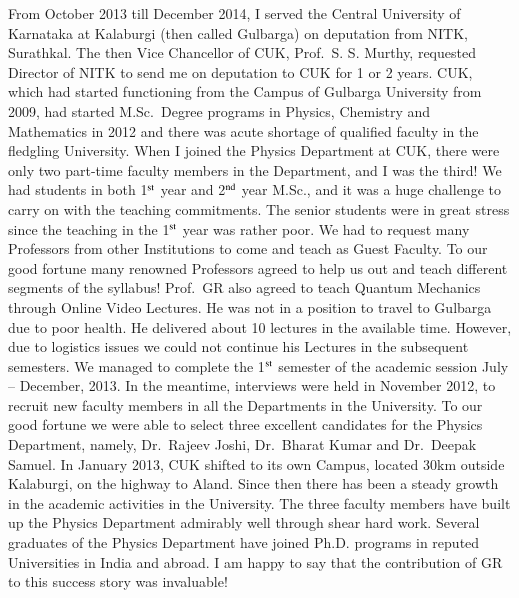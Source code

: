 From October 2013 till December 2014, I served the Central University of Karnataka at Kalaburgi (then called Gulbarga) on deputation from NITK, Surathkal. The then Vice Chancellor of CUK, Prof.\ S. S. Murthy, requested Director of NITK to send me on deputation to CUK for 1 or 2 years. CUK, which had started functioning from the Campus of Gulbarga University from 2009, had started M.Sc.\ Degree programs in Physics, Chemistry and Mathematics in 2012 and there was acute shortage of qualified faculty in the fledgling University. When I joined the Physics Department at CUK, there were only two part-time faculty members in the Department, and I was the third! We had students in both 1$^{\rm st}$ year and 2$^{\rm nd}$ year M.Sc., and it was a huge challenge to carry on with the teaching commitments. The senior students were in great stress since the teaching in the 1$^{\rm st}$ year was rather poor. We had to request many Professors from other Institutions to come and teach as Guest Faculty. To our good fortune many renowned Professors agreed to help us out and teach different segments of the syllabus! Prof.\ GR also agreed to teach Quantum Mechanics through Online Video Lectures. He was not in a position to travel to Gulbarga due to poor health. He delivered about 10 lectures in the available time. However, due to logistics issues we could not continue his Lectures in the subsequent semesters. We managed to complete the 1$^{\rm st}$ semester of the academic session July – December, 2013. In the meantime, interviews were held in November 2012, to recruit new faculty members in all the Departments in the University. To our good fortune we were able to select three excellent candidates for the Physics Department, namely, Dr.\ Rajeev Joshi, Dr.\ Bharat Kumar and Dr.\ Deepak Samuel. In January 2013, CUK shifted to its own Campus, located 30km outside Kalaburgi, on the highway to Aland. Since then there has been a steady growth in the academic activities in the University. The three faculty members have built up the Physics Department admirably well through shear hard work. Several graduates of the Physics Department have joined Ph.D. programs in reputed Universities in India and abroad. I am happy to say that the contribution of GR to this success story was invaluable!

